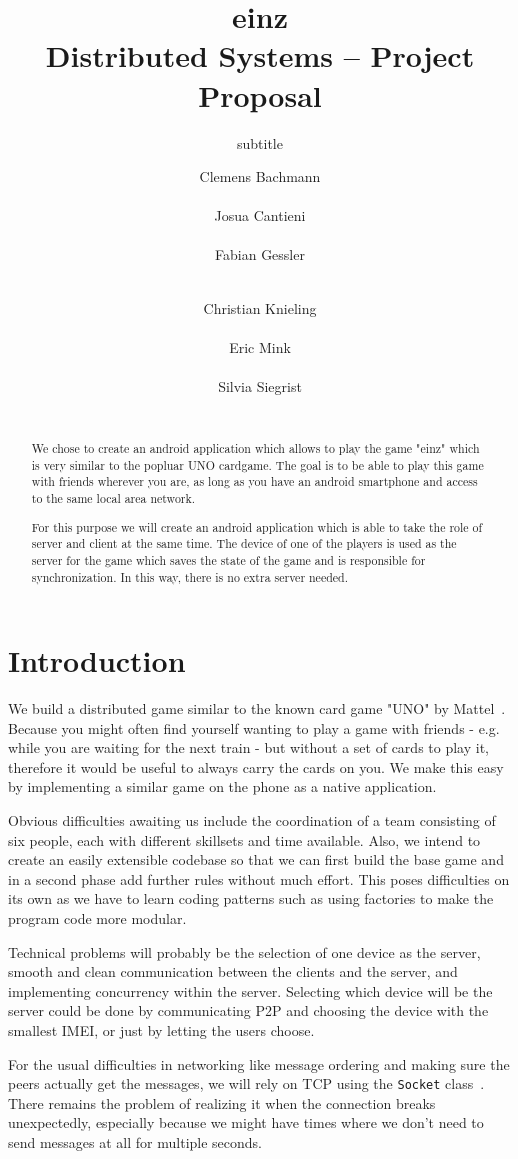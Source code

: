 \documentclass{sig-alternate}
\title{einz\\
\normalsize{Distributed Systems -- Project Proposal}}
\subtitle{subtitle}
\author{
\alignauthor
\normalsize{Clemens Bachmann}\\
	\affaddr{\normalsize{13-932-488}}\\
	\email{\normalsize{baclemen@student.ethz.ch}}
%
\alignauthor
\normalsize{Josua Cantieni}\\
	\affaddr{\normalsize{15-919-038}}\\
	\email{\normalsize{josuac@student.ethz.ch}}
%
\alignauthor
\normalsize{Fabian Gessler}\\
	\affaddr{\normalsize{15-939-341}}\\
	\email{\normalsize{fgessler@student.ethz.ch}}
\and
\alignauthor
\normalsize{Christian Knieling}\\
	\affaddr{\normalsize{ 14-923-809}}\\
	\email{\normalsize{knielinc@student.ethz.ch}}
%
\alignauthor
\normalsize{Eric Mink}\\
	\affaddr{\normalsize{15-917-057}}\\
	\email{\normalsize{minker@student.ethz.ch}}
%
\alignauthor
\normalsize{Silvia Siegrist}\\
	\affaddr{\normalsize{15-935-893}}\\
	\email{\normalsize{sisilvia@student.ethz.ch}}
}
\begin{document}
\maketitle

\begin{abstract}
We chose to create an android application which allows to play the game "einz" which is very similar to the popluar UNO cardgame. The goal is to be able to play this game with friends wherever you are, as long as you have an android smartphone and access to the same local area network.

For this purpose we will create an android application which is able to take the role of server and client at the same time. The device of one of the players is used as the server for the game which saves the state of the game and is responsible for synchronization. In this way, there is no extra server needed.
\end{abstract}

\section{Introduction}
We build a distributed game similar to the known card game "UNO" by Mattel~\cite{unoshop}. Because you might often find yourself wanting to play a game with friends - e.g. while you are waiting for the next train - but without a set of cards to play it, therefore it would be useful to always carry the cards on you. We make this easy by implementing a similar game on the phone as a native application.

Obvious difficulties awaiting us include the coordination of a team consisting of six people, each with different skillsets and time available.
Also, we intend to create an easily extensible codebase so that we can first build the base game and in a second phase add further rules without much effort. This poses difficulties on its own as we have to learn coding patterns such as using factories to make the program code more modular.

Technical problems will probably be the selection of one device as the server, smooth and clean communication between the clients and the server, and implementing concurrency within the server. Selecting which device will be the server could be done by communicating P2P and choosing the device with the smallest IMEI, or just by letting the users choose.

For the usual difficulties in networking like message ordering and making sure the peers actually get the messages, we will rely on TCP using the \verb|Socket| class~\cite{socketdoc}. There remains the problem of realizing it when the connection breaks unexpectedly, especially because we might have times where we don't need to send messages at all for multiple seconds.
\end{document}
